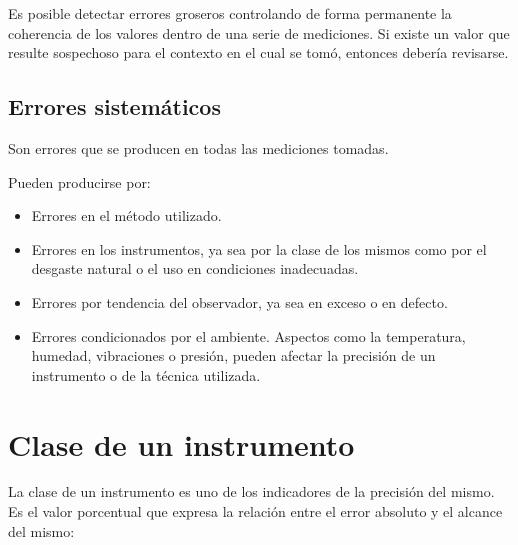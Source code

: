 Es posible detectar errores groseros controlando de forma permanente la coherencia de los valores dentro de una serie de mediciones. Si existe un valor que resulte sospechoso para el contexto en el cual se tomó, entonces debería revisarse.

\subsection{Errores sistemáticos}

Son errores que se producen en todas las mediciones tomadas.

Pueden producirse por:
\begin{itemize}
	\item Errores en el método utilizado.
	\item Errores en los instrumentos, ya sea por la clase de los mismos como por el desgaste natural o el uso en condiciones inadecuadas.
	\item Errores por tendencia del observador, ya sea en exceso o en defecto.
	\item Errores condicionados por el ambiente. Aspectos como la temperatura, humedad, vibraciones o presión, pueden afectar la precisión de un instrumento o de la técnica utilizada.
\end{itemize}
\section{Clase de un instrumento}
La clase de un instrumento es uno de los indicadores de la precisión del mismo. Es el valor porcentual que expresa la relación entre el error absoluto y el alcance del mismo:

